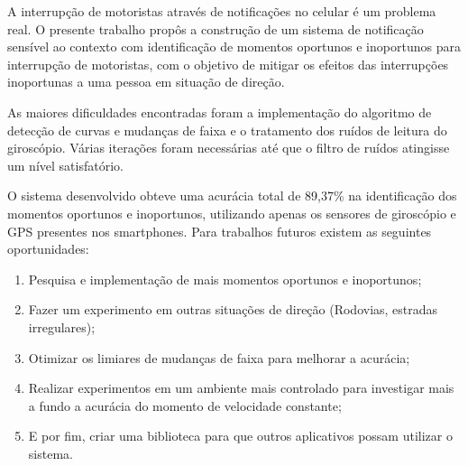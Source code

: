 \label{conclusao}

A interrupção de motoristas através de notificações no celular é um problema
real. O presente trabalho propôs a construção de um sistema de notificação sensível ao
contexto com identificação de momentos oportunos e inoportunos para interrupção de
motoristas, com o objetivo de mitigar os efeitos das interrupções inoportunas a uma
pessoa em situação de direção.

As maiores dificuldades encontradas foram a implementação do algoritmo de detecção
de curvas e mudanças de faixa e o tratamento dos ruídos de leitura do giroscópio.
Várias iterações foram necessárias até que o filtro de ruídos atingisse um nível
satisfatório.

O sistema desenvolvido obteve uma acurácia total de 89,37\% na identificação dos momentos
oportunos e inoportunos, utilizando apenas os sensores de giroscópio e GPS presentes
nos smartphones. Para trabalhos futuros existem as seguintes oportunidades:

\begin{enumerate}
  \item Pesquisa e implementação de mais momentos oportunos e inoportunos;
  \item Fazer um experimento em outras situações de direção (Rodovias, estradas irregulares);
  \item Otimizar os limiares de mudanças de faixa para melhorar a acurácia;
  \item Realizar experimentos em um ambiente mais controlado para investigar mais a fundo
  a acurácia do momento de velocidade constante;
  \item E por fim, criar uma biblioteca para que outros aplicativos possam utilizar o sistema.
\end{enumerate}
